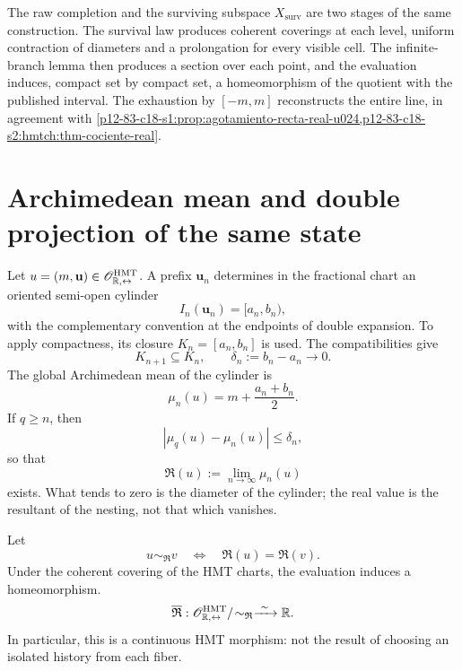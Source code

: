 \begin{remark}
\label{p12-83-c18-s2:hmtch:rem-version-superviviente}
The raw completion and the surviving subspace
\(X_{\mathrm{surv}}\) are two stages of the same construction. The survival
law produces coherent coverings at each level, uniform contraction
of diameters and a prolongation for every visible cell. The infinite-branch
lemma then produces a section over each point, and the
evaluation induces, compact set by compact set, a homeomorphism of the quotient with the
published interval. The exhaustion by \([-m,m]\) reconstructs the entire line,
in agreement with
\cref{p12-83-c18-s1:prop:agotamiento-recta-real-u024,p12-83-c18-s2:hmtch:thm-cociente-real}.
\end{remark}

\section{Archimedean mean and double projection of the same state}

Let \(u=(m,\mathbf u)\in
\mathscr O_{\mathbb R,\leftrightarrow}^{\rm HMT}\). A prefix
\(\mathbf u_n\) determines in the fractional chart an oriented
semi-open cylinder
\[
 I_n(\mathbf u_n)=[a_n,b_n),
\]
with the complementary convention at the endpoints of double expansion. To
apply compactness, its closure
\(K_n=[a_n,b_n]\) is used. The compatibilities give
\[
 K_{n+1}\subseteq K_n,
 \qquad
 \delta_n:=b_n-a_n\longrightarrow0.
\]
The global Archimedean mean of the cylinder is
\[
 \mu_n(u)=m+\frac{a_n+b_n}{2}.
\]
If \(q\geq n\), then
\[
 |\mu_q(u)-\mu_n(u)|\leq\delta_n,
\]
so that
\begin{equation}
 \mathfrak R(u):=\lim_{n\to\infty}\mu_n(u)
 \label{p12-83-c18-s2:hmtch:eq-media-arquimediana}
\end{equation}
exists. What tends to zero is the diameter of the cylinder; the real value
is the resultant of the nesting, not that which vanishes.

\begin{theorem}
\label{p12-83-c18-s2:hmtch:thm-cociente-two-way-real}
Let
\[
 u\sim_{\mathfrak R}v
 \quad\Longleftrightarrow\quad
 \mathfrak R(u)=\mathfrak R(v).
\]
Under the coherent covering of the HMT charts, the evaluation induces a homeomorphism.
\begin{equation}
 \overline{\mathfrak R}:
 \mathscr O_{\mathbb R,\leftrightarrow}^{\rm HMT}/\!
 \sim_{\mathfrak R}
 \xrightarrow{\ \sim\ }\mathbb R.
 \label{p12-83-c18-s2:hmtch:eq-homeomorfismo-two-way-real}
\end{equation}
In particular, this is a continuous HMT morphism: not the result of choosing
an isolated history from each fiber.
\end{theorem}


